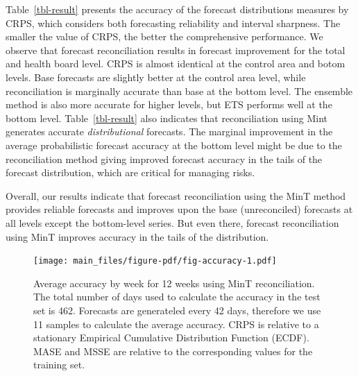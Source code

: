 \documentclass[
  authoryear,
  preprint,
  3p]{elsarticle}
\begin{document}
Table~\ref{tbl-result} presents the accuracy of the forecast
distributions measures by CRPS, which considers both forecasting
reliability and interval sharpness. The smaller the value of CRPS, the
better the comprehensive performance. We observe that forecast
reconciliation results in forecast improvement for the total and health
board level. CRPS is almost identical at the control area and botom
levels. Base forecasts are slightly better at the control area level,
while reconciliation is marginally accurate than base at the bottom
level. The ensemble method is also more accurate for higher levels, but
ETS performs well at the bottom level. Table~\ref{tbl-result} also
indicates that reconciliation using Mint generates accurate
\emph{distributional} forecasts. The marginal improvement in the average
probabilistic forecast accuracy at the bottom level might be due to the
reconciliation method giving improved forecast accuracy in the tails of
the forecast distribution, which are critical for managing risks.

Overall, our results indicate that forecast reconciliation using the
MinT method provides reliable forecasts and improves upon the base
(unreconciled) forecasts at all levels except the bottom-level series.
But even there, forecast reconciliation using MinT improves accuracy in
the tails of the distribution.

\begin{figure}[H]

{\centering \texttt{[image: main\_files/figure-pdf/fig-accuracy-1.pdf]}

}

\caption{\label{fig-accuracy}Average accuracy by week for 12 weeks using
MinT reconciliation. The total number of days used to calculate the
accuracy in the test set is 462. Forecasts are generateled every 42
days, therefore we use 11 samples to calculate the average accuracy.
CRPS is relative to a stationary Empirical Cumulative Distribution
Function (ECDF). MASE and MSSE are relative to the corresponding values
for the training set.}

\end{figure}
\end{document}

